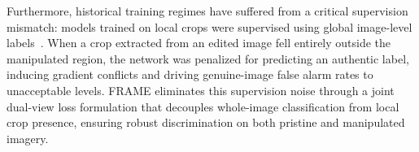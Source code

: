 Furthermore, historical training regimes have suffered from a critical supervision mismatch: models trained on local crops were supervised using global image-level labels~\cite{trufor,mvss}. When a crop extracted from an edited image fell entirely outside the manipulated region, the network was penalized for predicting an authentic label, inducing gradient conflicts and driving genuine-image false alarm rates to unacceptable levels. FRAME eliminates this supervision noise through a joint dual-view loss formulation that decouples whole-image classification from local crop presence, ensuring robust discrimination on both pristine and manipulated imagery.
